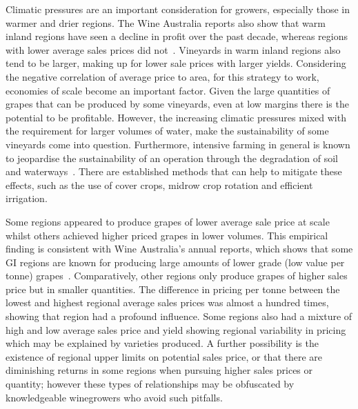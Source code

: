 \documentclass[10pt,letterpaper]{article}
\begin{document}
Climatic pressures are an important consideration for growers, especially those in warmer and drier regions. The Wine Australia reports also show that warm inland regions have seen a decline in profit over the past decade, whereas regions with lower average sales prices did not~\cite{wineaustraliaNationalVintageReport2019,wineaustraliaNationalVintageReport2020,wineaustraliaNationalVintageReport2021,winemakersfederationofaustraliaNationalVintageReport2013,winemakersfederationofaustraliaNationalVintageReport2014,winemakersfederationofaustraliaNationalVintageReport2015,winemakersfederationofaustraliaNationalVintageReport2016,winemakersfederationofaustraliaNationalVintageReport2017,winemakersfederationofaustraliaNationalVintageReport2018}. Vineyards in warm inland regions also tend to be larger, making up for lower sale prices with larger yields. Considering the negative correlation of average price to area, for this strategy to work, economies of scale become an important factor. Given the large quantities of grapes that can be produced by some vineyards, even at low margins there is the potential to be profitable. However, the increasing climatic pressures mixed with the requirement for larger volumes of water, make the sustainability of some vineyards come into question. Furthermore, intensive farming in general is known to jeopardise the sustainability of an operation through the degradation of soil and waterways~\cite{capelloEffectsTractorPasses2019,linHydropedologySynergisticIntegration2012,pisciottaGroundwaterNitrateRisk2015}. There are established methods that can help to mitigate these effects, such as the use of cover crops, midrow crop rotation and efficient irrigation.
\par
Some regions appeared to produce grapes of lower average sale price at scale whilst others achieved higher priced grapes in lower volumes. This empirical finding is consistent with Wine Australia's annual reports, which shows that some GI regions are known for producing large amounts of lower grade (low value per tonne) grapes~\cite{wineaustraliaNationalVintageReport2022,winemakersfederationofaustraliaNationalVintageReport2017}. Comparatively, other regions only produce grapes of higher sales price but in smaller quantities. The difference in pricing per tonne between the lowest and highest regional average sales prices was almost a hundred times, showing that region had a profound influence. Some regions also had a mixture of high and low average sales price and yield showing regional variability in pricing which may be explained by varieties produced. A further possibility is the existence of regional upper limits on potential sales price, or that there are diminishing returns in some regions when pursuing higher sales prices or quantity; however these types of relationships may be obfuscated by knowledgeable winegrowers who avoid such pitfalls.
\end{document}

